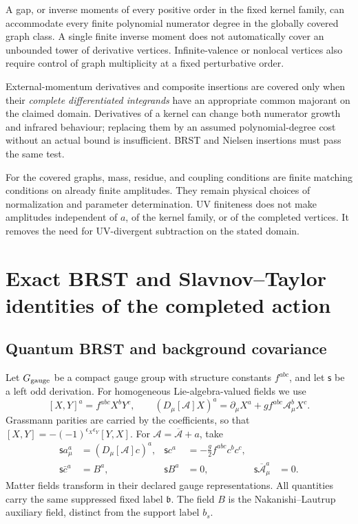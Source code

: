 \documentclass[final,5p,times,twocolumn,numbers,nopreprintline]{elsarticle}
\numberwithin{equation}{section}
\theoremstyle{definition}
\theoremstyle{remark}
\newcommand{\bb}{\mathfrak b}
\newcommand{\BR}{\mathsf s}
\begin{document}
A gap, or inverse moments of every positive order in the fixed kernel
family, can accommodate every finite polynomial numerator degree in
the globally covered graph class. A single finite inverse moment does not automatically
cover an unbounded tower of derivative vertices. Infinite-valence
or nonlocal vertices also require control of graph multiplicity at a
fixed perturbative order.

External-momentum derivatives and composite insertions are covered
only when their \emph{complete differentiated integrands} have an
appropriate common majorant on the claimed domain. Derivatives of a
kernel can change both numerator growth and infrared behaviour;
replacing them by an assumed polynomial-degree cost without an
actual bound is insufficient. BRST and Nielsen insertions must pass
the same test.

For the covered graphs, mass, residue, and coupling conditions are
finite matching conditions on already finite amplitudes. They remain
physical choices of normalization and parameter determination.
UV finiteness does not make amplitudes independent of \(a\), of the
kernel family, or of the completed vertices. It removes the need
for UV-divergent subtraction on the stated domain.
\section{Exact BRST and Slavnov--Taylor identities of the completed action}
\label{sec:brst}

\subsection{Quantum BRST and background covariance}

Let \(G_{\rm gauge}\) be a compact gauge group with structure
constants \(f^{abc}\), and let \(\BR\) be a left odd derivation.
For homogeneous Lie-algebra-valued fields we use
\[
 [X,Y]^a=f^{abc}X^bY^c,\qquad
 (D_\mu[\mathcal A]X)^a
       =\partial_\mu X^a+g f^{abc}\mathcal A_\mu^bX^c.
\]
Grassmann parities are carried by the coefficients, so that
\([X,Y]=-(-1)^{\epsilon_X\epsilon_Y}[Y,X]\).
For \(\mathcal A=\overline{\mathcal A}+a\), take
\begin{align}
 \BR a_\mu^a&=(D_\mu[\mathcal A]c)^a,
 &\BR c^a&=-\frac g2 f^{abc}c^bc^c,
 \label{eq:brst-gauge}\\
 \BR\bar c^a&=B^a,&
 \BR B^a&=0,&
 \BR\overline{\mathcal A}_\mu^a&=0 .
 \label{eq:brst-doublet}
\end{align}
Matter fields transform in their declared gauge representations.
All quantities carry the same suppressed fixed label \(\bb\).
The field \(B\) is the Nakanishi--Lautrup auxiliary field, distinct
from the support label \(b_s\).
\end{document}
